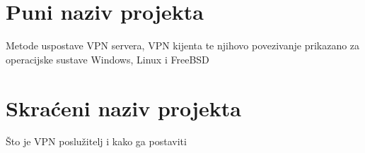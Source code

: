 	\newpage
	\section{Puni naziv projekta}
	\hfill \smallbreak
	Metode uspostave VPN servera, VPN kijenta te njihovo povezivanje prikazano za operacijske sustave Windows, Linux i FreeBSD
	\bigbreak

	\section{Skraćeni naziv projekta}
	\hfill \smallbreak
	Što je VPN poslužitelj i kako ga postaviti
	\bigbreak
